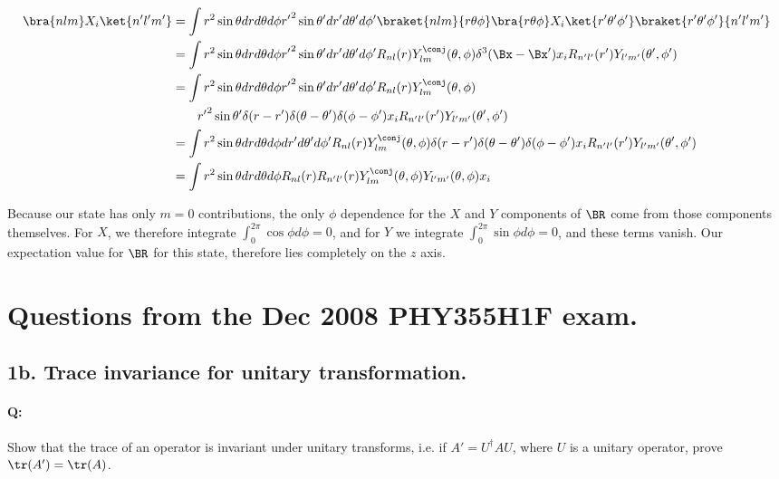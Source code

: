 \begin{align*}
\bra{nlm} X_i \ket{n'l'm'}
&=
\int 
r^2 \sin\theta dr d\theta d\phi
{r'}^2 \sin\theta' dr' d\theta' d\phi'
\braket{nlm}{r \theta \phi} \bra{r \theta \phi} X_i \ket{r' \theta' \phi' }\braket{r' \theta' \phi'}{n'l'm'} \\
&=
\int 
r^2 \sin\theta dr d\theta d\phi
{r'}^2 \sin\theta' dr' d\theta' d\phi'
R_{nl}(r) Y_{lm}^\conj(\theta,\phi)
\delta^3(\Bx - \Bx') x_i
R_{n'l'}(r') Y_{l'm'}(\theta',\phi')
\\
&=
\int 
r^2 \sin\theta dr d\theta d\phi
{r'}^2 \sin\theta' dr' d\theta' d\phi'
R_{nl}(r) Y_{lm}^\conj(\theta,\phi) \\
&\qquad{r'}^2 \sin\theta' \delta(r-r') \delta(\theta - \theta') \delta(\phi-\phi')
x_i
R_{n'l'}(r') Y_{l'm'}(\theta',\phi')
\\
&=
\int 
r^2 \sin\theta dr d\theta d\phi
dr' d\theta' d\phi'
R_{nl}(r) Y_{lm}^\conj(\theta,\phi) 
\delta(r-r') \delta(\theta - \theta') \delta(\phi-\phi')
x_i
R_{n'l'}(r') Y_{l'm'}(\theta',\phi')
\\
&=
\int 
r^2 \sin\theta dr d\theta d\phi
R_{nl}(r) R_{n'l'}(r) 
Y_{lm}^\conj(\theta,\phi) Y_{l'm'}(\theta,\phi)
x_i
\\
\end{align*}

Because our state has only $m=0$ contributions, the only $\phi$ dependence for the $X$ and $Y$ components of $\BR$ come from those components themselves.  For $X$, we therefore integrate $\int_0^{2\pi} \cos\phi d\phi = 0$, and for $Y$ we integrate $\int_0^{2\pi} \sin\phi d\phi = 0$, and these terms vanish.  Our expectation value for $\BR$ for this state, therefore lies completely on the $z$ axis.

\section{Questions from the Dec 2008 PHY355H1F exam.}

\subsection{1b. Trace invariance for unitary transformation.}

\paragraph{Q:} Show that the trace of an operator is invariant under unitary transforms, i.e. if $A' = U^\dagger A U$, where $U$ is a unitary operator, prove $\tr(A') = \tr(A)$.

